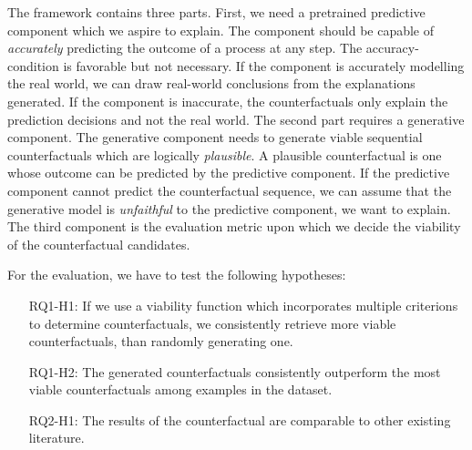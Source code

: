 \documentclass[./../../paper.tex]{subfiles}
\begin{document}
\noindent The framework contains three parts. First, we need a pretrained predictive component which we aspire to explain. The component should be capable of \emph{accurately} predicting the outcome of a process at any step. The accuracy-condition is favorable but not necessary. If the component is accurately modelling the real world, we can draw real-world conclusions from the explanations generated. If the component is inaccurate, the counterfactuals only explain the prediction decisions and not the real world. The second part requires a generative component. The generative component needs to generate viable sequential counterfactuals which are logically \emph{plausible}. A plausible counterfactual is one whose outcome can be  predicted by the predictive component. If the predictive component cannot predict the counterfactual sequence, we can assume that the generative model is \emph{unfaithful} to the predictive component, we want to explain. The third component is the evaluation metric upon which we decide the viability of the counterfactual candidates.

For the evaluation, we have to test the following hypotheses: 
\begin{itemize}
    \item[RQ1-H1:] If we use a viability function which incorporates multiple criterions to determine counterfactuals, we consistently retrieve more viable counterfactuals, than randomly generating one.
    \item[RQ1-H2:] The generated counterfactuals consistently outperform the most viable counterfactuals among examples in the dataset.  
    \item[RQ2-H1:] The results of the counterfactual are comparable to other existing literature.  
\end{itemize}
\end{document}
